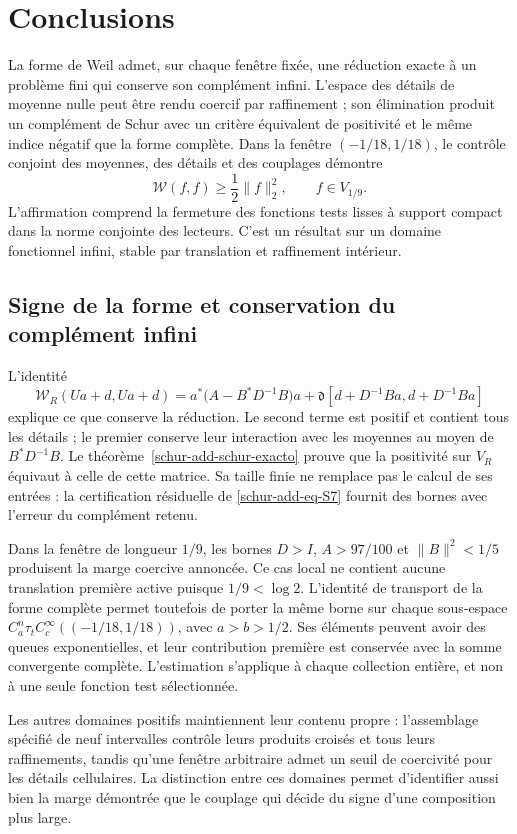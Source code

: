 \section{Conclusions}
\label{rz:conclusiones}

La forme de Weil admet, sur chaque fenêtre fixée, une réduction exacte à un problème fini qui conserve son complément infini. L'espace des détails de moyenne nulle peut être rendu coercif par raffinement ; son élimination produit un complément de Schur avec un critère équivalent de positivité et le même indice négatif que la forme complète. Dans la fenêtre $(-1/18,1/18)$, le contrôle conjoint des moyennes, des détails et des couplages démontre
\[
\mathscr W(f,f)\geq\frac12\|f\|_2^2,
\qquad f\in V_{1/9}.
\]
L’affirmation comprend la fermeture des fonctions tests lisses
à support compact dans la norme conjointe des lecteurs.
C’est un résultat sur un domaine fonctionnel infini, stable
par translation et raffinement intérieur.

\subsection*{Signe de la forme et conservation du complément infini}

L’identité
\[
\mathscr W_R(Ua+d,Ua+d)
=a^*\bigl(A-B^*D^{-1}B\bigr)a
+\mathfrak d[d+D^{-1}Ba,d+D^{-1}Ba]
\]
explique ce que conserve la réduction. Le second terme est
positif et contient tous les détails ; le premier conserve
leur interaction avec les moyennes au moyen de $B^*D^{-1}B$.
Le théorème~\ref{schur-add-schur-exacto} prouve que la
positivité sur $V_R$ équivaut à celle de cette matrice.
Sa taille finie ne remplace pas le calcul de ses entrées :
la certification résiduelle de
\eqref{schur-add-eq-S7} fournit des bornes avec l'erreur du
complément retenu.

Dans la fenêtre de longueur $1/9$, les bornes $D>I$, $A>97/100$ et $\|B\|^2<1/5$ produisent la marge coercive annoncée. Ce cas local ne contient aucune translation première active puisque $1/9<\log2$. L'identité de transport de la forme complète permet toutefois de porter la même borne sur chaque sous-espace $C_a^n\tau_t C_c^\infty((-1/18,1/18))$, avec $a>b>1/2$. Ses éléments peuvent avoir des queues exponentielles, et leur contribution première est conservée avec la somme convergente complète. L'estimation s'applique à chaque collection entière, et non à une seule fonction test sélectionnée.

Les autres domaines positifs maintiennent leur contenu propre : l'assemblage spécifié de neuf intervalles contrôle leurs produits croisés et tous leurs raffinements, tandis qu'une fenêtre arbitraire admet un seuil de coercivité pour les détails cellulaires. La distinction entre ces domaines permet d'identifier aussi bien la marge démontrée que le couplage qui décide du signe d'une composition plus large.

